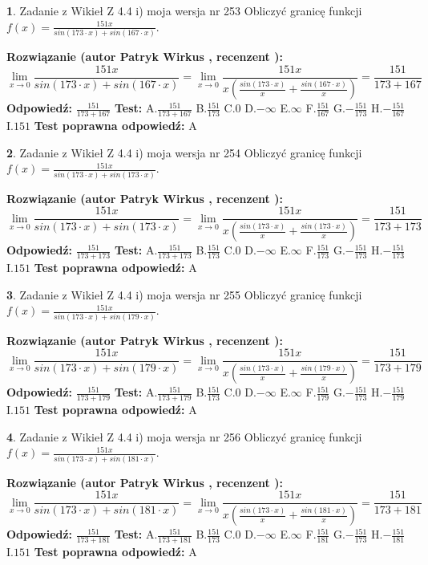\documentclass[12pt, a4paper]{article}
\theoremstyle{definition} %
\newtheorem{zad}{}
\newcommand{\zadStart}[1]{\begin{zad}#1\newline}
\newcommand{\zadStop}{\end{zad}}
\newcommand{\rozwStart}[2]{\noindent \textbf{Rozwiązanie (autor #1 , recenzent #2): }\newline}
\newcommand{\rozwStop}{\newline}
\newcommand{\odpStart}{\noindent \textbf{Odpowiedź:}\newline}
\newcommand{\odpStop}{\newline}
\newcommand{\testStart}{\noindent \textbf{Test:}\newline}
\newcommand{\testStop}{\newline}
\newcommand{\kluczStart}{\noindent \textbf{Test poprawna odpowiedź:}\newline}
\newcommand{\kluczStop}{\newline}
\begin{document}
\zadStart{Zadanie z Wikieł Z 4.4 i) moja wersja nr 253}
Obliczyć granicę funkcji $f(x)=\frac{151x}{sin(173\cdot x) +sin(167\cdot x)}$.
\zadStop
\rozwStart{Patryk Wirkus}{}
$$\lim\limits_{x\to 0}\frac{151x}{sin(173\cdot x) +sin(167\cdot x)}=\lim\limits_{x\to 0}\frac{151x}{x(\frac{sin(173\cdot x)}{x}+\frac{sin(167\cdot x)}{x})}=\frac{151}{173+167}$$
\rozwStop
\odpStart
$\frac{151}{173+167}$
\odpStop
\testStart
A.$\frac{151}{173+167}$
B.$\frac{151}{173}$
C.$0$
D.$-\infty$
E.$\infty$
F.$\frac{151}{167}$
G.$-\frac{151}{173}$
H.$-\frac{151}{167}$
I.$151$
\testStop
\kluczStart
A
\kluczStop



\zadStart{Zadanie z Wikieł Z 4.4 i) moja wersja nr 254}
Obliczyć granicę funkcji $f(x)=\frac{151x}{sin(173\cdot x) +sin(173\cdot x)}$.
\zadStop
\rozwStart{Patryk Wirkus}{}
$$\lim\limits_{x\to 0}\frac{151x}{sin(173\cdot x) +sin(173\cdot x)}=\lim\limits_{x\to 0}\frac{151x}{x(\frac{sin(173\cdot x)}{x}+\frac{sin(173\cdot x)}{x})}=\frac{151}{173+173}$$
\rozwStop
\odpStart
$\frac{151}{173+173}$
\odpStop
\testStart
A.$\frac{151}{173+173}$
B.$\frac{151}{173}$
C.$0$
D.$-\infty$
E.$\infty$
F.$\frac{151}{173}$
G.$-\frac{151}{173}$
H.$-\frac{151}{173}$
I.$151$
\testStop
\kluczStart
A
\kluczStop



\zadStart{Zadanie z Wikieł Z 4.4 i) moja wersja nr 255}
Obliczyć granicę funkcji $f(x)=\frac{151x}{sin(173\cdot x) +sin(179\cdot x)}$.
\zadStop
\rozwStart{Patryk Wirkus}{}
$$\lim\limits_{x\to 0}\frac{151x}{sin(173\cdot x) +sin(179\cdot x)}=\lim\limits_{x\to 0}\frac{151x}{x(\frac{sin(173\cdot x)}{x}+\frac{sin(179\cdot x)}{x})}=\frac{151}{173+179}$$
\rozwStop
\odpStart
$\frac{151}{173+179}$
\odpStop
\testStart
A.$\frac{151}{173+179}$
B.$\frac{151}{173}$
C.$0$
D.$-\infty$
E.$\infty$
F.$\frac{151}{179}$
G.$-\frac{151}{173}$
H.$-\frac{151}{179}$
I.$151$
\testStop
\kluczStart
A
\kluczStop



\zadStart{Zadanie z Wikieł Z 4.4 i) moja wersja nr 256}
Obliczyć granicę funkcji $f(x)=\frac{151x}{sin(173\cdot x) +sin(181\cdot x)}$.
\zadStop
\rozwStart{Patryk Wirkus}{}
$$\lim\limits_{x\to 0}\frac{151x}{sin(173\cdot x) +sin(181\cdot x)}=\lim\limits_{x\to 0}\frac{151x}{x(\frac{sin(173\cdot x)}{x}+\frac{sin(181\cdot x)}{x})}=\frac{151}{173+181}$$
\rozwStop
\odpStart
$\frac{151}{173+181}$
\odpStop
\testStart
A.$\frac{151}{173+181}$
B.$\frac{151}{173}$
C.$0$
D.$-\infty$
E.$\infty$
F.$\frac{151}{181}$
G.$-\frac{151}{173}$
H.$-\frac{151}{181}$
I.$151$
\testStop
\kluczStart
A
\kluczStop
\end{document}
